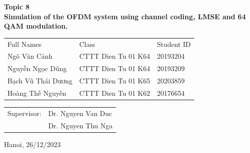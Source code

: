 \begin{center}
    \textbf{\fontsize{21pt}{0pt}\selectfont Topic 8 \\}
    \textbf{\fontsize{21pt}{0pt}\selectfont Simulation of the OFDM system using channel coding, LMSE and 64 QAM modulation. }
\vspace{7pt}
\begin{table}[H]
    \centering
    \begin{tabular}{l l l}
        Full Names          & Class                 & Student ID \\
        Ngô Văn Cảnh        & CTTT Dien Tu 01 K64   & 20193204 \\
        Nguyễn Ngọc Dũng    & CTTT Dien Tu 01 K64   & 20193209 \\
        Bạch Vũ Thái Dương  & CTTT Dien Tu 01 K65   & 20203859 \\
        Hoàng Thế Nguyên    & CTTT Dien Tu 01 K62   & 20176654 \\
    \end{tabular}
\end{table}
\vspace{1.5cm}
\begin{table}[H]
    \centering
    \begin{tabular}{l l}
        \fontsize{14pt}{0pt}\selectfont Supervisor: & \fontsize{14pt}{0pt}\selectfont Dr. Nguyen Van Duc \\
        {} & Dr. Nguyen Thu Nga \hspace{5pt} \\
    \end{tabular}
\end{table}
\vspace{1.5cm}
\fontsize{14pt}{0pt}\selectfont Hanoi, 26/12/2023
\end{center}

